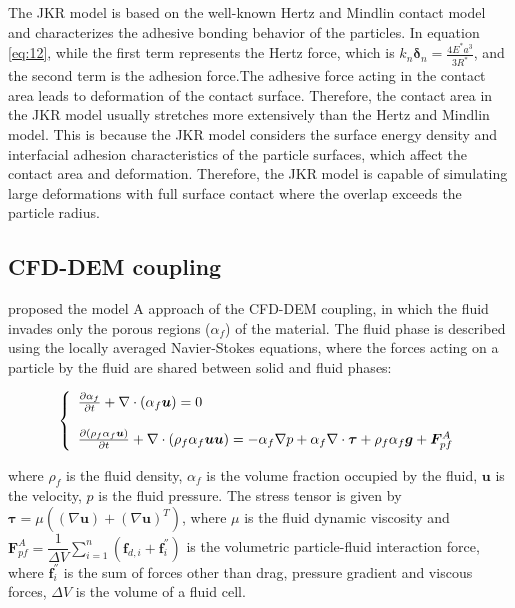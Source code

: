 \documentclass{article}
\begin{document}
The JKR model is based on the well-known Hertz \citep{hertz1882ueber} and Mindlin \citep{mindlin1949compliance} contact model and characterizes the adhesive bonding behavior of the particles. In equation \ref{eq:12}, while the first term represents the Hertz force, which is $k_{n} \bm{\delta}_n = \frac{4E^{*}a^{3}}{3R^{*}}$, and the second term is the adhesion force.The adhesive force acting in the contact area leads to deformation of the contact surface. Therefore, the contact area in the JKR model usually stretches more extensively than the Hertz and Mindlin model. This is because the JKR model considers the surface energy density and interfacial adhesion characteristics of the particle surfaces, which affect the contact area and deformation. Therefore, the JKR model is capable of simulating large deformations with full surface contact where the overlap exceeds the particle radius.


\subsection{CFD-DEM coupling}

\cite{zhu2007discrete} proposed the model A approach of the CFD-DEM coupling, in which the fluid invades only the porous regions ($\alpha_f $) of the material. The fluid phase is described using the locally averaged Navier-Stokes equations, where the forces acting on a particle by the fluid are shared between solid and fluid phases: 

\begin{equation}
 \left\{
\begin{array}{l}
\frac{\partial \alpha_f}{\partial t} + \nabla\cdot (\alpha_f \bm{u})=  0 \\ \vspace{0.01cm} \\
\frac{\partial (\rho_f \alpha_f \bm{u})}{\partial t} + \nabla \cdot \left( \rho_f \alpha_f \bm{u}\bm{u}\right)=  -\alpha_f \nabla p +\alpha_f \nabla \cdot \bm{\tau} + \rho_f \alpha_f \bm{g} + \bm{F}^{A}_{pf}  
 \label{eq:5} \\
 \end{array} 
  \right.
\end{equation}


where $\rho_f$ is the fluid density, $\alpha_f$ is the volume fraction occupied by the fluid, $\bm{u}$ is the velocity, $p$ is the fluid pressure. The stress tensor is given by
$\bm{\tau}=\mu\left( (\nabla \bm{u})+(\nabla \bm{u})^T\right)$, where $\mu$ is the fluid dynamic viscosity and $\bm{F}_{pf}^{A}=\dfrac{1}{\Delta V}\sum_{i=1}^{n} \left( \bm f_{d,i} +  \bm{f}^{''}_i \right)$  is the volumetric particle-fluid interaction force, where $ \bm{f}^{''}_i$ is the sum of forces other than drag, pressure gradient and viscous forces, $\Delta V$ is the volume of a fluid cell. 
\end{document}
